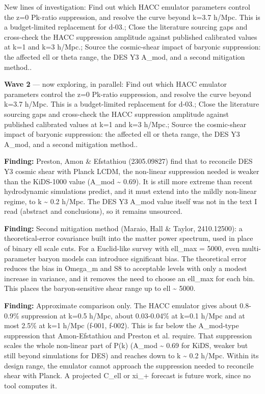 \documentclass[11pt,a4paper]{article}
\begin{document}
New lines of investigation: Find out which HACC emulator parameters control the z=0 Pk-ratio suppression, and resolve the curve beyond k=3.7 h/Mpc. This is a budget-limited replacement for d-03.; Close the literature sourcing gaps and cross-check the HACC suppression amplitude against published calibrated values at k=1 and k=3 h/Mpc.; Source the cosmic-shear impact of baryonic suppression: the affected ell or theta range, the DES Y3 A\_mod, and a second mitigation method..

\textbf{Wave 2} --- now exploring, in parallel: Find out which HACC emulator parameters control the z=0 Pk-ratio suppression, and resolve the curve beyond k=3.7 h/Mpc. This is a budget-limited replacement for d-03.; Close the literature sourcing gaps and cross-check the HACC suppression amplitude against published calibrated values at k=1 and k=3 h/Mpc.; Source the cosmic-shear impact of baryonic suppression: the affected ell or theta range, the DES Y3 A\_mod, and a second mitigation method..

\textbf{Finding:} Preston, Amon \& Efstathiou (2305.09827) find that to reconcile DES Y3 cosmic shear with Planck LCDM, the non-linear suppression needed is weaker than the KiDS-1000 value (A\_mod \textasciitilde{} 0.69). It is still more extreme than recent hydrodynamic simulations predict, and it must extend into the mildly non-linear regime, to k \textasciitilde{} 0.2 h/Mpc. The DES Y3 A\_mod value itself was not in the text I read (abstract and conclusions), so it remains unsourced.

\textbf{Finding:} Second mitigation method (Maraio, Hall \& Taylor, 2410.12500): a theoretical-error covariance built into the matter power spectrum, used in place of binary ell scale cuts. For a Euclid-like survey with ell\_max = 5000, even multi-parameter baryon models can introduce significant bias. The theoretical error reduces the bias in Omega\_m and S8 to acceptable levels with only a modest increase in variance, and it removes the need to choose an ell\_max for each bin. This places the baryon-sensitive shear range up to ell \textasciitilde{} 5000.

\textbf{Finding:} Approximate comparison only. The HACC emulator gives about 0.8-0.9\% suppression at k=0.5 h/Mpc, about 0.03-0.04\% at k=0.1 h/Mpc and at most 2.5\% at k=1 h/Mpc (f-001, f-002). This is far below the A\_mod-type suppression that Amon-Efstathiou and Preston et al. require. That suppression scales the whole non-linear part of P(k) (A\_mod \textasciitilde{} 0.69 for KiDS, weaker but still beyond simulations for DES) and reaches down to k \textasciitilde{} 0.2 h/Mpc. Within its design range, the emulator cannot approach the suppression needed to reconcile shear with Planck. A projected C\_ell or xi\_+ forecast is future work, since no tool computes it.
\end{document}
